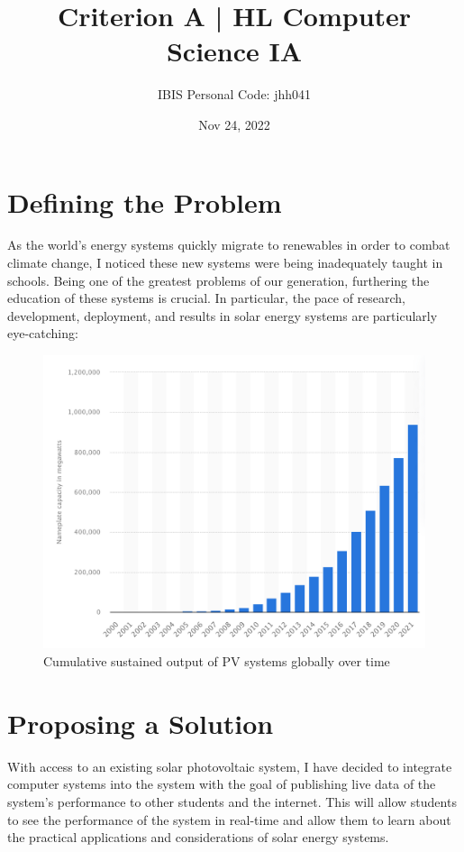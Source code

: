 \documentclass[titlepage]{article}
\title{Criterion A | HL Computer Science IA}
\author{IBIS Personal Code: jhh041}
\date{Nov 24, 2022}
\begin{document}
\maketitle

\tableofcontents
\pagebreak

\section{Defining the Problem}
As the world's energy systems quickly migrate to renewables in order to combat climate change, I noticed these new systems were being inadequately taught in schools. Being one of the greatest problems of our generation, furthering the education of these systems is crucial. In particular, the pace of research, development, deployment, and results in solar energy systems are particularly eye-catching: 

\vspace*{5mm}

\begin{figure}[h]
  \includegraphics[width=\linewidth]{images/SCR-20221124-7e6.png}
  \caption{Cumulative sustained output of PV systems globally over time}
  \label{fig:graph}
\end{figure}

\vspace*{5mm}

\section{Proposing a Solution}
With access to an existing solar photovoltaic system, I have decided to integrate computer systems into the system with the goal of publishing live data of the system's performance to other students and the internet. This will allow students to see the performance of the system in real-time and allow them to learn about the practical applications and considerations of solar energy systems.
\end{document}
